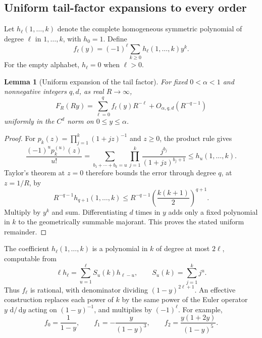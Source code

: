\documentclass[11pt,letterpaper]{article}
\newtheorem{lemma}[theorem]{Lemma}
\theoremstyle{remark}\newtheorem{remark}[theorem]{Remark}
\newcommand{\dd}{\,\mathrm d}
\begin{document}
\subsection{Uniform tail-factor expansions to every order}
Let $h_\ell(1,\ldots,k)$ denote the complete homogeneous symmetric polynomial of degree $\ell$ in $1,\ldots,k$, with $h_0=1$. Define
\begin{equation}\label{amc:bm:cap:f-coeff}
 f_\ell(y)=(-1)^\ell\sum_{k\ge0}h_\ell(1,\ldots,k)y^k.
\end{equation}
For the empty alphabet, $h_\ell=0$ when $\ell>0$.

\begin{lemma}[Uniform expansion of the tail factor]\label{amc:bm:cap:F-expand}
For fixed $0<\alpha<1$ and nonnegative integers $q,d$, as real $R\to\infty$,
\begin{equation}\label{amc:bm:cap:F-allorders}
 F_R(Ry)=\sum_{\ell=0}^qf_\ell(y)R^{-\ell}
 +O_{\alpha,q,d}(R^{-q-1})
\end{equation}
uniformly in the $C^d$ norm on $0\le y\le\alpha$.
\end{lemma}
\begin{proof}
For $p_k(z)=\prod_{j=1}^k(1+jz)^{-1}$ and $z\ge0$, the product rule gives
\[
 \frac{(-1)^u p_k^{(u)}(z)}{u!}
 =\sum_{b_1+\cdots+b_k=u}\prod_{j=1}^k
   \frac{j^{b_j}}{(1+jz)^{b_j+1}}
 \le h_u(1,\ldots,k).
\]
Taylor's theorem at $z=0$ therefore bounds the error through degree $q$, at $z=1/R$, by
\begin{equation}\label{amc:bm:cap:F-error}
 R^{-q-1}h_{q+1}(1,\ldots,k)
 \le R^{-q-1}\left(\frac{k(k+1)}2\right)^{q+1}.
\end{equation}
Multiply by $y^k$ and sum. Differentiating $d$ times in $y$ adds only a fixed polynomial in $k$ to the geometrically summable majorant. This proves the stated uniform remainder.
\end{proof}
The coefficient $h_\ell(1,\ldots,k)$ is a polynomial in $k$ of degree at most $2\ell$, computable from
\begin{equation}\label{amc:bm:cap:h-recursion}
 \ell h_\ell=\sum_{u=1}^\ell S_u(k)h_{\ell-u},\qquad
 S_u(k)=\sum_{j=1}^k j^u.
\end{equation}
Thus $f_\ell$ is rational, with denominator dividing $(1-y)^{2\ell+1}$. An effective construction replaces each power of $k$ by the same power of the Euler operator $y\,\dd/\dd y$ acting on $(1-y)^{-1}$, and multiplies by $(-1)^\ell$. For example,
\begin{equation}\label{amc:bm:cap:first-f}
 f_0=\frac1{1-y},\qquad f_1=-\frac y{(1-y)^3},\qquad
 f_2=\frac{y(1+2y)}{(1-y)^5}.
\end{equation}
\end{document}
